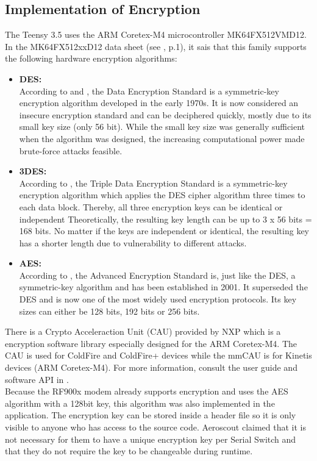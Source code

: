 \subsection{Implementation of Encryption}%
The Teensy 3.5 uses the ARM Coretex-M4 microcontroller MK64FX512VMD12. In the MK64FX512xxD12 data sheet (see \cite{NXP_Datasheet}, p.1), it sais that this family supports the following hardware encryption algorithms:\begin{itemize}
    \item \textbf{DES:}\\
    According to \cite{DES_Wikipedia} and \cite{3DES_Wikipedia}, the Data Encryption Standard is a symmetric-key encryption algorithm developed in the early 1970s. It is now considered an insecure encryption standard and can be deciphered quickly, mostly due to its small key size (only 56 bit).  While the small key size was generally sufficient when the algorithm was designed, the increasing computational power made brute-force attacks feasible. 
    \item \textbf{3DES:}\\
    According to \cite{3DES_Wikipedia}, the Triple Data Encryption Standard is a symmetric-key encryption algorithm which applies the DES cipher algorithm three times to each data block. Thereby, all three encryption keys can be identical or independent Theoretically, the resulting key length can be up to 3 x 56 bits = 168 bits. No matter if the keys are independent or identical, the resulting key has a shorter length due to vulnerability to different attacks. 
    \item \textbf{AES:}\\
    According to \cite{AES_Wikipedia}, the Advanced Encryption Standard is, just like the DES, a symmetric-key algorithm and has been established in 2001. It superseded the DES and is now one of the most widely used encryption protocols. Its key sizes can either be 128 bits, 192 bits or 256 bits. 
\end{itemize}
There is a Crypto Acceleraction Unit (CAU) provided by NXP which is a encryption software library especially designed for the ARM Coretex-M4. The CAU is used for ColdFire and ColdFire+ devices while the mmCAU is for Kinetis devices (ARM Coretex-M4). For more information, consult the user guide and software API in \cite{CAU_UserGuide}.\\
Because the RF900x modem already supports encryption and uses the AES algorithm with a 128bit key, this algorithm was also implemented in the application. The encryption key can be stored inside a header file so it is only visible to anyone who has access to the source code. Aeroscout claimed that it is not necessary for them to have a unique encryption key per Serial Switch and that they do not require the key to be changeable during runtime.
%
%
%
%
%
%
%